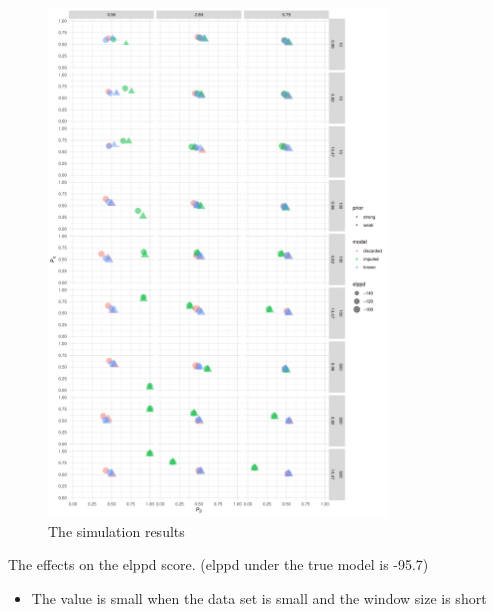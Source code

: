 \begin{figure}
    \centering
    \includegraphics[width=0.8\textwidth]{./figures/ch-2/sim-results-pvalues.pdf}
    \caption{The simulation results}
    \label{fig:sim-study-pvalue}
\end{figure}

The effects on the elppd score. (elppd under the true model is -95.7)
\begin{itemize}
    \item The value is small when the data set is small and the window size is short
\end{itemize}

